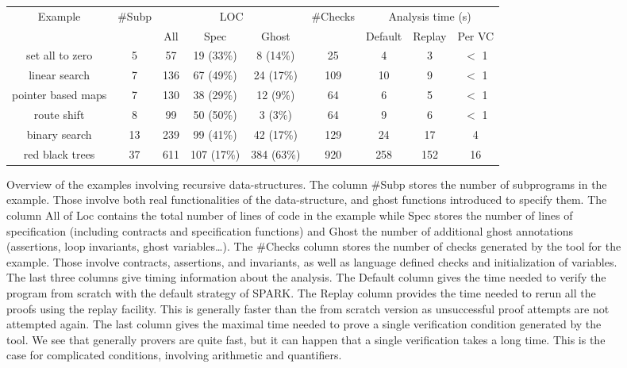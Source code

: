 \documentclass[runningheads]{llncs}
\begin{document}
\begin{figure}
\setlength{\tabcolsep}{3pt}
\renewcommand{\arraystretch}{1.5}
\begin{center}
\scriptsize
\begin{tabular}{ c c ccc c ccc }
 \hline
\multirow{2}{*}{Example} &
\multirow{2}{*}{\#Subp} &
\multicolumn{3}{c}{LOC}&
\multirow{2}{*}{\#Checks} &
\multicolumn{3}{c}{Analysis time (s)}\\
& & All & Spec & Ghost & &
Default & Replay & Per VC\\
\hline
set all to zero
& 5
& 57
& 19 (33\%)
& 8 (14\%)
& 25
& 4
& 3
& $<$ 1\\
linear search
& 7
& 136
& 67 (49\%)
& 24 (17\%)
& 109
& 10
& 9
& $<$ 1\\
pointer based maps
& 7
& 130
& 38 (29\%)
& 12 (9\%)
& 64
& 6
& 5
& $<$ 1\\
route shift
& 8
& 99
& 50 (50\%)
& 3 (3\%)
& 64
& 9
& 6
& $<$ 1\\
binary search
& 13
& 239
& 99 (41\%)
& 42 (17\%)
& 129
& 24
& 17
& 4\\
red black trees
& 37
& 611
& 107 (17\%)
& 384 (63\%)
& 920
& 258
& 152
& 16\\
\hline
\end{tabular}
\end{center}
\caption {\label{table-examples}Overview of the examples involving recursive data-structures. The column \#Subp stores the number of subprograms in the example. Those involve both real functionalities of the data-structure, and ghost functions introduced to specify them. The column All of Loc contains the total number of lines of code in the example while Spec stores the number of lines of specification (including contracts and specification functions) and Ghost the number of additional ghost annotations (assertions, loop invariants, ghost variables…). The \#Checks column stores the number of checks generated by the tool for the example. Those involve contracts, assertions, and invariants, as well as language defined checks and initialization of variables. The last three columns give timing information about the analysis. The Default column gives the time needed to verify the program from scratch with the default strategy of SPARK. The Replay column provides the time needed to rerun all the proofs using the replay facility. This is generally faster than the from scratch version as unsuccessful proof attempts are not attempted again. The last column gives the maximal time needed to prove a single verification condition generated by the tool. We see that generally provers are quite fast, but it can happen that a single verification takes a long time. This is the case for complicated conditions, involving arithmetic and quantifiers.}
\end{figure}
\end{document}

